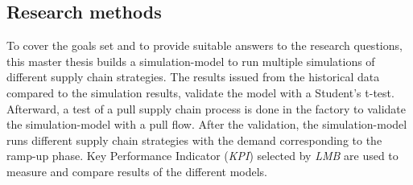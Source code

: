 \newpage
\subsection{Research methods}
\label{section:research_methods}

To cover the goals set and to provide suitable answers to the research questions, this master thesis builds a simulation-model to run multiple simulations of different supply chain strategies.
The results issued from the historical data compared to the simulation results,  validate the model with a Student's t-test. Afterward, a test of a pull supply chain process is done in the factory to validate the simulation-model with a pull flow.
After the validation, the simulation-model runs different supply chain strategies with the demand corresponding to the ramp-up phase. Key Performance Indicator (\textit{KPI}) selected by \textit{LMB} are used to measure and compare results of the different models. 